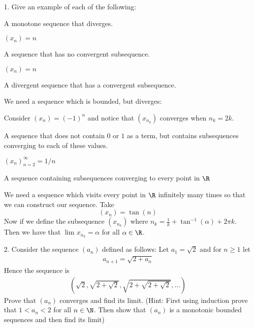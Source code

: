 
1. Give an example of each of the following:
\begin{alphabetize}
	\item A monotone sequence that diverges.

		$\left( x_n \right) = n$
	\item A sequence that has no convergent subsequence.

		$\left( x_n \right) = n$
	\item A divergent sequence that has a convergent subsequence.

		We need a sequence which is bounded, but diverges: 

		Consider $\left( x_n \right)  = \left( -1 \right)^{n}$ and notice that $\left( x_{n_k} \right) $ converges when $n_k = 2k$.
	\item A sequence that does not contain $0$ or $1$ as a term, but contains subsequences converging to each of these values.

		$\left( x_n \right)_{n=2}^{\infty } = 1 / n$
	\item A sequence containing subsequences converging to every point in $\R$

		We need a sequence which visits every point in $\R$ infinitely many times so that we can construct our sequence. Take
		\begin{equation}
			\left( x_n \right) = \tan\left( n \right) 
		\end{equation}
		Now if we define the subsequence $\left( x_{n_k} \right) $ where $n_k = \frac{1}{k} + \tan^{-1}\left( \alpha \right) + 2 \pi k$. Then we have that $\lim_{} x_{n_k} = \alpha$ for all $\alpha \in  \R$.
\end{alphabetize}
2. Consider the sequence $\left( a_n \right) $ defined as follows: Let $a_1 = \sqrt{2} $ and for $n \ge 1$ let 
	\begin{align}
		a_{n+1} = \sqrt{2 + a_n} 
	\end{align}
Hence the sequence is
	\begin{align}
		\left( \sqrt{2}, \sqrt{2 + \sqrt{2}}, \sqrt{2 + \sqrt{2 + \sqrt{2} } }, \ldots \right) 
	\end{align}
Prove that $\left( a_n \right) $ converges and find its limit. (Hint: First using induction prove that $1 < a_n < 2$ for all $n \in \N$. Then show that $\left( a_n \right) $ is a monotonic bounded sequences and then find its limit)

